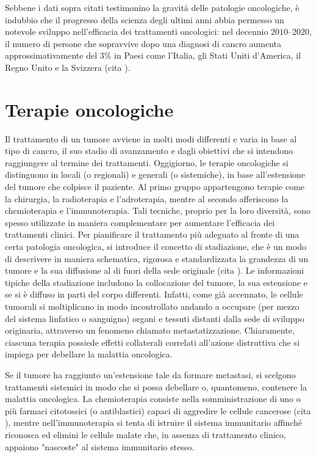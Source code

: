 \documentclass[12pt,a4paper,twoside]{report}
\begin{document}
	Sebbene i dati sopra citati testimonino la gravità delle patologie oncologiche, è indubbio che il progresso della scienza degli ultimi anni abbia permesso un notevole sviluppo nell'efficacia dei trattamenti oncologici: nel decennio $2010$--$2020$, il numero di persone che sopravvive dopo una diagnosi di cancro aumenta approssimativamente del $3\%$ in Paesi come l'Italia, gli Stati Uniti d'America, il Regno Unito e la Svizzera (cita
	).
	
	\section{Terapie oncologiche}\label{sec:1.2}
	Il trattamento di un tumore avviene in molti modi differenti e varia in base al tipo di cancro, il suo stadio di avanzamento e dagli obiettivi che si intendono raggiungere al termine dei trattamenti. Oggigiorno, le terapie oncologiche si distinguono in locali (o regionali) e generali (o sistemiche), in base all'estensione del tumore che colpisce il paziente. Al primo gruppo appartengono terapie come la chirurgia, la radioterapia e l'adroterapia, mentre al secondo afferiscono la chemioterapia e l'immunoterapia. Tali tecniche, proprio per la loro diversità, sono spesso utilizzate in maniera complementare per aumentare l'efficacia dei trattamenti clinici. Per pianificare il trattamento più adeguato al fronte di una certa patologia oncologica, si introduce il concetto di stadiazione, che è un modo di descrivere in maniera schematica, rigorosa e standardizzata la grandezza di un tumore e la sua diffusione al di fuori della sede originale (cita
	). Le informazioni tipiche della stadiazione includono la collocazione del tumore, la sua estensione e se si è diffuso in parti del corpo differenti. Infatti, come già accennato, le cellule tumorali si moltiplicano in modo incontrollato andando a occupare (per mezzo del sistema linfatico o sanguigno) organi e tessuti distanti dalla sede di sviluppo originaria, attraverso un fenomeno chiamato metastatizzazione. Chiaramente, ciascuna terapia possiede effetti collaterali correlati all'azione distruttiva che si impiega per debellare la malattia oncologica.
	
	Se il tumore ha raggiunto un'estensione tale da formare metastasi, si scelgono trattamenti sistemici in modo che si possa debellare o, quantomeno, contenere la malattia oncologica. La chemioterapia consiste nella somministrazione di uno o più farmaci citotossici (o antiblastici) capaci di aggredire le cellule cancerose (cita
	), mentre nell'immunoterapia si tenta di istruire il sistema immunitario affinché riconosca ed elimini le cellule malate che, in assenza di trattamento clinico, appaiono "nascoste" al sistema immunitario stesso.
	
\end{document}
